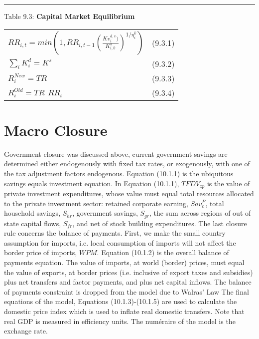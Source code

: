 \documentclass{article}
\begin{document}
\noindent\rule{\linewidth}{0.4pt}

\begin{center}
\begin{large}
{\centering Table 9.3: \textbf{Capital Market Equilibrium} \par}


\begin{tabular}{>{\raggedright}p{} l}


$RR_{i, t}= min\left(1, RR_{i, t-1}\left(\frac{Kv^{d, v}_i)}{K^s_{i, 0}}\right)^{1/{\eta^k_i}}\right)$ & (9.3.1) \\[15pt]

$\displaystyle \sum_i K^d_i = K^s$ & (9.3.2) \\[15pt]

$R^{New}_i = TR$ & (9.3.3) \\[15pt]

$R^{Old}_i = TR\hspace{5pt}RR_i$ & (9.3.4) \\[20pt]

\hline
\end{tabular}
\end{large}
\end{center}

\section{Macro Closure}

Government closure was discussed above, current government savings are determined either endogenously with fixed tax rates, or exogenously, with one of the tax adjustment factors endogenous.
Equation (10.1.1) is the ubiquitous savings equals investment equation. In Equation (10.1.1), $TFDV_{zp}$ is the value of private investment expenditures, whose value must equal total resources allocated to the private investment sector:  retained corporate earning, $Sav^P_c$, total household savings, $S_{hr}$, government savings, $S_{gr}$, the sum across regions of out of state capital flows, $S_{fr}$, and net of stock building expenditures.
The last closure rule concerns the balance of payments. First, we make the small country assumption for imports, i.e. local consumption of imports will not affect the border price of imports, $WPM$. Equation (10.1.2) is the overall balance of payments equation. The value of imports, at world (border) prices, must equal the value of exports, at border prices (i.e. inclusive of export taxes and subsidies) plus net transfers and factor payments, and plus net capital inflows. The balance of payments constraint is dropped from the model due to Walras’ Law
The final equations of the model, Equations (10.1.3)-(10.1.5) are used to calculate the domestic price index which is used to inflate real domestic transfers. Note that real GDP is measured in efficiency units. The numéraire of the model is the exchange rate.
\end{document}
